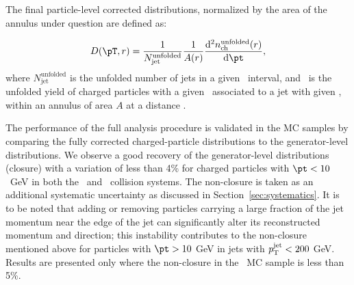 The final particle-level corrected distributions, normalized by the area of the annulus under question are defined as:

\begin{align*}
   \Dptr = \frac{1}{N_\mathrm{jet}^\mathrm{unfolded}} \frac{1}{A(r)} \frac{\fd^2 \nchunf(r)}{\fd \pt},
 \end{align*}
where $N_\mathrm{jet}^\mathrm{unfolded}$ is the unfolded number of jets in a given \ptjet\ interval, and \nchunf\  is the unfolded yield of charged particles with a given \pt\ associated to a jet with given \ptjet, within an annulus of area $A$ at a distance \rvar.

The performance of the full analysis procedure is validated in the MC samples by comparing the fully corrected charged-particle distributions to the generator-level distributions.
We observe a good recovery of the generator-level distributions (closure) with a variation of less than 4\% for charged particles with \mbox{$\pt < 10$ GeV} in both the \pp\ and \pbpb\ collision systems.
The non-closure is taken as an additional systematic uncertainty as discussed in Section~\ref{sec:systematics}.
It is to be noted that adding or removing particles carrying a large fraction of the jet momentum near the edge of the jet can significantly alter its reconstructed momentum and direction; this instability contributes to the non-closure mentioned above for particles with $\pt > 10$ GeV in jets with $\mbox{$p_{\mathrm{T}}^{\mathrm{jet}}$} < 200$ GeV.
Results are presented only where the non-closure in the \pp\ MC sample is less than 5\%.




